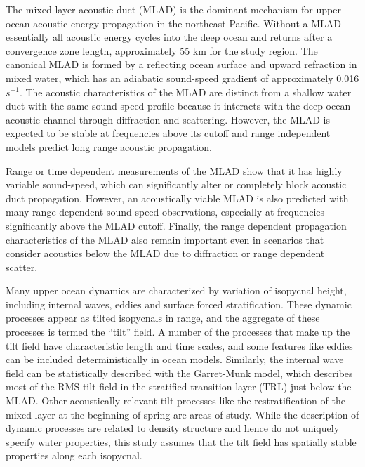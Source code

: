 \documentclass[preprint,NumberedRefs]{JASA}
\begin{document}
The mixed layer acoustic duct (MLAD) is the dominant mechanism for upper ocean acoustic energy propagation in the northeast Pacific. Without a MLAD essentially all acoustic energy cycles into the deep ocean and returns after a convergence zone length,\cite{jensen2011computational} approximately 55 km for the study region. The canonical MLAD is formed by a reflecting ocean surface and upward refraction in mixed water, which has an adiabatic sound-speed gradient of approximately 0.016 $s^{-1}$. The acoustic characteristics of the MLAD are distinct from a shallow water duct with the same sound-speed profile because it interacts with the deep ocean acoustic channel through diffraction\citep{porter93} and scattering.\cite{colosi2020observations} However, the MLAD is expected to be stable at frequencies above its cutoff\citep{Urick1982Prop} and range independent models predict long range acoustic propagation.

Range or time dependent measurements of the MLAD show that it has highly variable sound-speed,\citep{cole2010seasonal,rudnick1999compensation,klymak2015} which can significantly alter or completely block acoustic duct propagation.\citep{colosi2020observations,colosi21} However, an acoustically viable MLAD is also predicted with many range dependent sound-speed observations, especially at frequencies significantly above the MLAD cutoff. Finally, the range dependent propagation characteristics of the MLAD also remain important even in scenarios that consider acoustics below the MLAD due to diffraction or range dependent scatter.\citep{colosi21}

Many upper ocean dynamics are characterized by variation of isopycnal height, including internal waves, eddies and surface forced stratification. These dynamic processes appear as tilted isopycnals in range, and the aggregate of these processes is termed the ``tilt'' field.\cite{dzieciuch2004} A number of the processes that make up the tilt field have characteristic length and time scales, and some features like eddies can be included deterministically in ocean models. Similarly, the internal wave field can be statistically described with the Garret-Munk model,\cite{garrett1972space} which describes most of the RMS tilt field in the stratified transition layer (TRL) just below the MLAD. Other acoustically relevant tilt processes like the restratification of the mixed layer at the beginning of spring are areas of study.\cite{cole2010seasonal} While the description of dynamic processes are related to density structure and hence do not uniquely specify water properties, this study assumes that the tilt field has spatially stable properties along each isopycnal.
\end{document}
